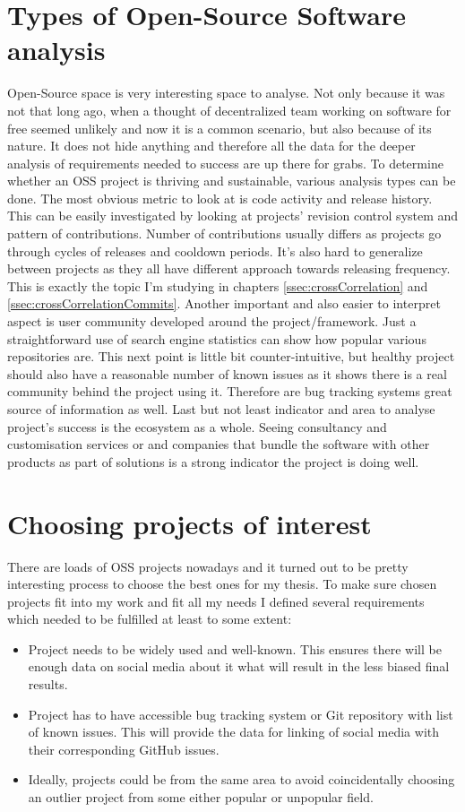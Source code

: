 \section{Types of Open-Source Software analysis}
Open-Source space is very interesting space to analyse. Not only because it was not that long ago, when a thought of decentralized team working on software for free seemed unlikely and now it is a common scenario, but also because of its nature. It does not hide anything and therefore all the data for the deeper analysis of requirements needed to success are up there for grabs. 
To determine whether an OSS project is thriving and sustainable, various analysis types can be done. The most obvious metric to look at is code activity and release history. This can be easily investigated by looking at projects' revision control system and pattern of contributions. Number of contributions usually differs as projects go through cycles of releases and cooldown periods. It's also hard to generalize between projects as they all have different approach towards releasing frequency. This is exactly the topic I'm studying in chapters \ref{ssec:crossCorrelation} and \ref{ssec:crossCorrelationCommits}.  Another important and also easier to interpret aspect is user community developed around the project/framework. Just a straightforward use of search engine statistics can show how popular various repositories are. This next point is little bit counter-intuitive, but healthy project should also have a reasonable number of known issues as it shows there is a real community behind the project using it. Therefore are bug tracking systems great source of information as well. Last but not least indicator and area to analyse project's success is the ecosystem as a whole. Seeing consultancy and customisation services or and companies that bundle the software with other products as part of solutions is a strong indicator the project is doing well.

\section{Choosing projects of interest}
There are loads of OSS projects nowadays and it turned out to be pretty interesting process to choose the best ones for my thesis. To make sure chosen projects fit into my work and fit  all my needs I defined several requirements which needed to be fulfilled at least to some extent:

\begin{itemize}
  \item Project needs to be widely used and well-known. This ensures there will be enough data on social media about it what will result in the less biased final results.
  \item Project has to have accessible bug tracking system or Git repository with list of known issues. This will provide the data for linking of social media with their corresponding GitHub issues.
  \item Ideally, projects could be from the same area to avoid coincidentally choosing an outlier project from some either popular or unpopular field.
\end{itemize}

